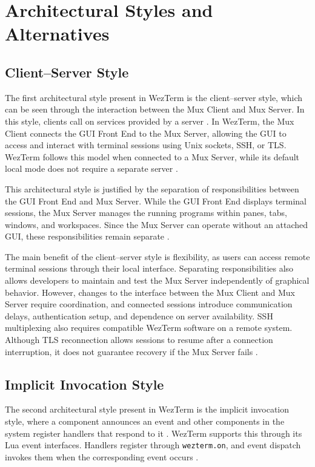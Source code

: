 \section{Architectural Styles and Alternatives}
\label{sec:architectural-styles}

\subsection{Client--Server Style}

The first architectural style present in WezTerm is the client--server style, which can be seen through the interaction between the Mux Client and Mux Server. In this style, clients call on services provided by a server \cite{arch-styles}. In WezTerm, the Mux Client connects the GUI Front End to the Mux Server, allowing the GUI to access and interact with terminal sessions using Unix sockets, SSH, or TLS. WezTerm follows this model when connected to a Mux Server, while its default local mode does not require a separate server \cite{multiplexing}.

This architectural style is justified by the separation of responsibilities between the GUI Front End and Mux Server. While the GUI Front End displays terminal sessions, the Mux Server manages the running programs within panes, tabs, windows, and workspaces. Since the Mux Server can operate without an attached GUI, these responsibilities remain separate \cite{mux-api}.

The main benefit of the client--server style is flexibility, as users can access remote terminal sessions through their local interface. Separating responsibilities also allows developers to maintain and test the Mux Server independently of graphical behavior. However, changes to the interface between the Mux Client and Mux Server require coordination, and connected sessions introduce communication delays, authentication setup, and dependence on server availability. SSH multiplexing also requires compatible WezTerm software on a remote system. Although TLS reconnection allows sessions to resume after a connection interruption, it does not guarantee recovery if the Mux Server fails \cite{multiplexing}.

\subsection{Implicit Invocation Style}

The second architectural style present in WezTerm is the implicit invocation style, where a component announces an event and other components in the system register handlers that respond to it \cite{arch-styles}. WezTerm supports this through its Lua event interfaces. Handlers register through \texttt{wezterm.on}, and event dispatch invokes them when the corresponding event occurs \cite{event-registration}.

